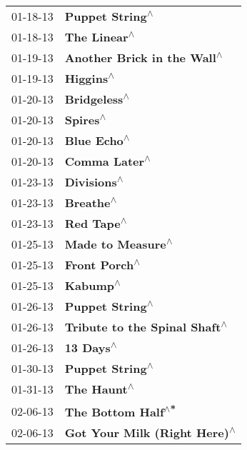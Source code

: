 \begin{supertabular}{p{0.25\columnwidth}p{0.75\columnwidth}}
 01-18-13 &                \textbf{Puppet String\textsuperscript{$\wedge$}} \\
 01-18-13 &                   \textbf{The Linear\textsuperscript{$\wedge$}} \\
 01-19-13 &    \textbf{Another Brick in the Wall\textsuperscript{$\wedge$}} \\
 01-19-13 &                      \textbf{Higgins\textsuperscript{$\wedge$}} \\
 01-20-13 &                   \textbf{Bridgeless\textsuperscript{$\wedge$}} \\
 01-20-13 &                       \textbf{Spires\textsuperscript{$\wedge$}} \\
 01-20-13 &                    \textbf{Blue Echo\textsuperscript{$\wedge$}} \\
 01-20-13 &                  \textbf{Comma Later\textsuperscript{$\wedge$}} \\
 01-23-13 &                    \textbf{Divisions\textsuperscript{$\wedge$}} \\
 01-23-13 &                      \textbf{Breathe\textsuperscript{$\wedge$}} \\
 01-23-13 &                     \textbf{Red Tape\textsuperscript{$\wedge$}} \\
 01-25-13 &              \textbf{Made to Measure\textsuperscript{$\wedge$}} \\
 01-25-13 &                  \textbf{Front Porch\textsuperscript{$\wedge$}} \\
 01-25-13 &                       \textbf{Kabump\textsuperscript{$\wedge$}} \\
 01-26-13 &                \textbf{Puppet String\textsuperscript{$\wedge$}} \\
 01-26-13 &  \textbf{Tribute to the Spinal Shaft\textsuperscript{$\wedge$}} \\
 01-26-13 &                      \textbf{13 Days\textsuperscript{$\wedge$}} \\
 01-30-13 &                \textbf{Puppet String\textsuperscript{$\wedge$}} \\
 01-31-13 &                    \textbf{The Haunt\textsuperscript{$\wedge$}} \\
 02-06-13 &             \textbf{The Bottom Half\textsuperscript{$\wedge$*}} \\
 02-06-13 &   \textbf{Got Your Milk (Right Here)\textsuperscript{$\wedge$}} \\

\end{supertabular}
